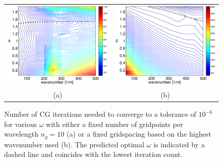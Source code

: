 \documentclass{article}
\begin{document}
\begin{figure}
\centering
\begin{tabular}{cc}
\includegraphics[scale=.3]{niter1}&
\includegraphics[scale=.3]{niter2}\\
{\small (a)}&{\small (b)}\\
\end{tabular}
\label{fig:exp1d}
\caption{Number of CG iterations needed to converge to a tolerance of $10^{-6}$ for various 
$\omega$ with either a fixed number of gridpoints per wavelength $n_g=10$ (a) or a fixed gridspacing based on the highest wavenumber used (b).
The predicted optimal $\omega$ is indicated by a dashed line and coincides with the lowest iteration count.}
\end{figure}
\end{document}

